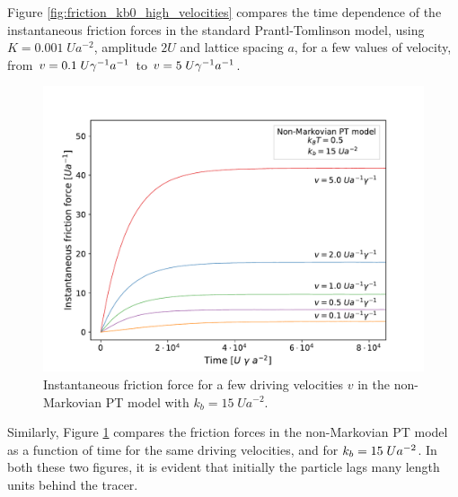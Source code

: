 Figure \ref{fig:friction_kb0_high_velocities} compares the time dependence of the instantaneous friction forces in the standard Prantl-Tomlinson model, using $K=0.001\;Ua^{-2}$, amplitude $2U$ and lattice spacing $a$, for a few values of velocity, from $v=0.1\hspace{0.1cm}U\gamma^{-1} a^{-1}$ to $v=5\hspace{0.1cm}U\gamma^{-1} a^{-1}$. 
\begin{figure}[ht!]
    \centering
    \includegraphics[width=\textwidth]{alteV_kb15_forzaplot.pdf}
    \caption{Instantaneous friction force for a few driving velocities $v$ in the non-Markovian PT model with $k_b=15\; Ua^{-2}$.}
    \label{fig:friction_kb15_high_velocities}
\end{figure}

Similarly, Figure \ref{fig:friction_kb15_high_velocities} compares the friction forces in the non-Markovian PT model as a function of time for the same driving velocities, and for $k_b=15\hspace{0.1cm}Ua^{-2}$.
In both these two figures, it is evident that initially the particle lags many length units behind the tracer.

